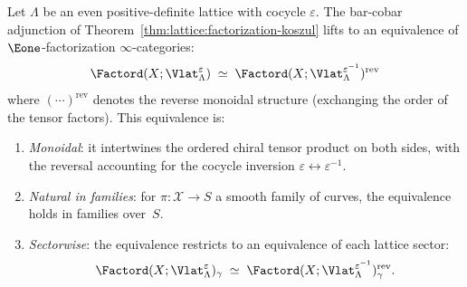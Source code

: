 \begin{theorem}
\label{thm:lattice:homotopy-factorization-dk}
Let $\Lambda$ be an even positive-definite lattice with cocycle
$\varepsilon$. The bar-cobar adjunction of
Theorem~\textup{\ref{thm:lattice:factorization-koszul}} lifts to an
equivalence of $\Eone$-factorization $\infty$-categories:
\begin{equation}\label{eq:lattice:homotopy-fact-dk}
\Factord(X; \Vlat_\Lambda^\varepsilon)
\;\simeq\;
\Factord(X; \Vlat_\Lambda^{\varepsilon^{-1}})^{\mathrm{rev}}
\end{equation}
where $(\cdots)^{\mathrm{rev}}$ denotes the reverse monoidal
structure \textup{(}exchanging the order of the tensor factors\textup{)}.
This equivalence is:
\begin{enumerate}[label=(\roman*)]
\item \emph{Monoidal}: it intertwines the ordered chiral tensor
 product on both sides, with the reversal accounting for the
 cocycle inversion $\varepsilon \leftrightarrow \varepsilon^{-1}$.
\item \emph{Natural in families}: for $\pi\colon \mathcal{X} \to S$
 a smooth family of curves, the equivalence holds in families
 over~$S$.
\item \emph{Sectorwise}: the equivalence restricts to an equivalence
 of each lattice sector:
 \[
 \Factord(X; \Vlat_\Lambda^\varepsilon)_\gamma
 \;\simeq\;
 \Factord(X; \Vlat_\Lambda^{\varepsilon^{-1}})_\gamma^{\mathrm{rev}}.
 \]
\end{enumerate}
\end{theorem}

